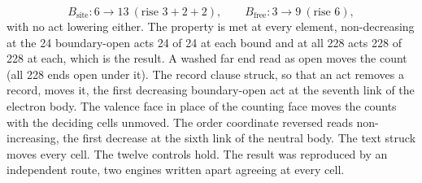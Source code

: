 \begin{chproof}[census]
\begin{equation}
B_{\mathrm{site}} : 6 \to 13 \ (\text{rise } 3 + 2 + 2), \qquad B_{\mathrm{free}} : 3 \to 9 \ (\text{rise } 6),
\end{equation}
with no act lowering either. The property is met at every element, non-decreasing at the 24 boundary-open acts 24 of 24 at each bound and at all 228 acts 228 of 228 at each, which is the result.
A washed far end read as open moves the count (all 228 ends open under it). The record clause struck, so that an act removes a record, moves it, the first decreasing boundary-open act at the seventh link of the electron body. The valence face in place of the counting face moves the counts with the deciding cells unmoved. The order coordinate reversed reads non-increasing, the first decrease at the sixth link of the neutral body. The text struck moves every cell. The twelve controls hold.
The result was reproduced by an independent route, two engines written apart agreeing at every cell.
\end{chproof}

\par\medskip{}\label{narr:close:11-1}\par
